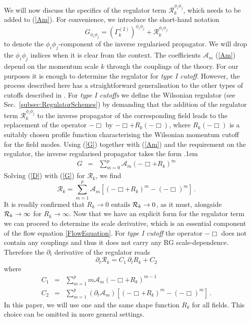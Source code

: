 \documentclass[notitlepage,eqsecnum,bm,amsmath,preprintnumbers,superscriptaddress,nofootinbib,aps,11pt]{revtex4-1}
\def\eq#1{(\ref{#1})}
\def\bea{\arraycolsep .1em \begin{eqnarray}}
\def\eea{\end{eqnarray}}
\begin{document}
We will now discuss the specifics of the regulator term $\mathcal{R}_k^{\phi_i\phi_j}$, which needs to be added to \eq{Am}. For convenience, we introduce the short-hand notation 
\begin{equation}
\label{G}
G_{\phi_i\phi_j}=\left(\Gamma^{(2)}_k\right)^{\phi_i\phi_j}+\mathcal{R}_k^{\phi_i\phi_j}
\end{equation} 
to denote the ${\phi_i\phi_j}$-component of the inverse regularised propagator. We will drop the $\phi_i\phi_j$ indices when it is clear from the context.  The coefficients $\mathcal{A}_m$ \eq{Am}  depend on the momentum scale $k$ through the couplings of the theory. 
For our purposes it is enough to determine the regulator for \emph{type I cutoff}. 
However, the process described here has a straightforward generalisation to the other types of cutoffs described in \cite{Codello:2008vh}. 
For \emph{type I cutoffs}  we define the Wilsonian regulator (see Sec.~\ref{subsec:RegulatorSchemes}) by demanding that the addition of the 
regulator term $\mathcal{R}_k^{\phi_i\phi_j}$ to the inverse propagator of the corresponding field leads to the replacement of 
the operator $-\Box$ by $-\Box+R_k(-\Box)$, where $R_k(-\Box)$ is a suitably chosen profile function characterising the Wilsonian momentum cutoff for the field modes. Using \eq{G} together with \eq{Am} and the requirement on the regulator, the inverse regularised propagator takes the form
\bea \label{D}
G 
&=&\sum_{m=0}^{p} \mathcal{A}_m (-\Box+R_k)^m \eea
Solving \eq{D} with \eq{G}  for $\mathcal{R}_k$, we find
\begin{equation}
\mathcal{R}_k=\sum_{m=1}^{p} \mathcal{A}_m \left[(-\Box+R_k)^m-
 (-\Box)^m\right]\label{GeneralRegulator}\,.
\end{equation}
It is readily confirmed that $R_k\to 0$ entails ${\cal R}_k\to 0$, as it must, alongside $ {\cal R}_k\to \infty$ for $R_k\to \infty$. Now that we have an explicit form for the regulator term we can proceed to determine its scale derivative, which is an essential component of the flow equation \eqref{FlowEquation}. For \emph{type I cutoff} the operator $-\Box$ does not contain any couplings and thus it does not carry any RG scale-dependence. Therefore the $\partial_t$ derivative of the regulator reads
\begin{equation}
\partial_t\mathcal{R}_k
=C_1\,\partial_tR_k+C_2\label{partialR}
\end{equation}
where 
\begin{eqnarray}
\label{C1} C_1&=&\sum_{m=1}^{p} m\mathcal{A}_m (-\Box+R_k)^{m-1}\\
\label{C2} C_2&=&\sum_{m=1}^{p} (\partial_t\mathcal{A}_m )\left[(-\Box+R_k)^m-
(-\Box)^m\right] \, .
\end{eqnarray}
In this paper, we will use one and the same shape function $R_k$ for all fields. This choice can be omitted in more general settings. 
\end{document}
